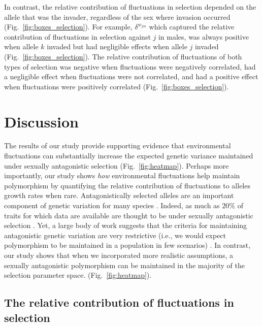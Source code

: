 \documentclass[12pt]{article}
\begin{document}
In contrast, the relative contribution of fluctuations in selection depended on the allele that was the invader, regardless of the sex where invasion occurred (Fig.~\ref{fig:boxes_selection}). For example, $\delta^{w_{jm}}$ which captured the relative contribution of fluctuations in selection against $j$ in males, was always positive when allele $k$ invaded but had negligible effects when allele $j$ invaded (Fig.~\ref{fig:boxes_selection}). The relative contribution of fluctuations of both types of selection was negative when fluctuations were negatively correlated, had a negligible effect when fluctuations were not correlated, and had a positive effect when fluctuations were positively correlated (Fig.~\ref{fig:boxes_selection}).

\section{Discussion}


The results of our study provide supporting evidence that environmental fluctuations can substantially increase the expected genetic variance maintained under sexually antagonistic selection (Fig.~\ref{fig:heatmap}). Perhaps more importantly, our study shows \textit{how} environmental fluctuations help maintain polymorphism by quantifying the relative contribution of fluctuations to alleles growth rates when rare. Antagonistically selected alleles are an important component of genetic variation for many species \citep{foerster2007sexually,van2009intralocus,bonduriansky2009intralocus,innocenti2010sexually}. Indeed, as much as $20\%$ of traits for which data are available are thought to be under sexually antagonistic selection \citep{morrissey2016meta}. Yet, a large body of work suggests that the criteria for maintaining antagonistic genetic variation are very restrictive (i.e., we would expect polymorphism to be maintained in a population in few scenarios) \citep{kidwell1977regions,pamilo1979genic,hedrick1999antagonistic,curtsinger1994antagonistic, patten2010fitness}. In contrast, our study shows that when we incorporated more realistic assumptions, a sexually antagonistic polymorphism can be maintained in  the majority of the selection parameter space. (Fig.~\ref{fig:heatmap}).

\subsection*{The relative contribution of fluctuations in selection}
\end{document}
